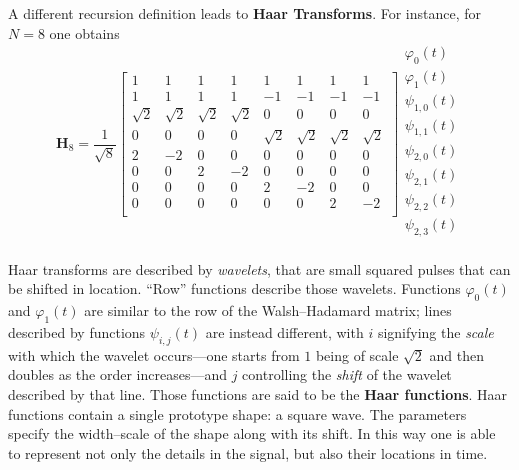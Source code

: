 \documentclass[\documentfontsize, twocolumn]{\classname}
\begin{document}
A different recursion definition leads to \textbf{Haar Transforms}. For instance, for $N=8$ one obtains
\begin{equation}\label{eqn:haarTransformExample}
    \bm H_8 = \frac {1}{\sqrt 8}
    \begin{bmatrix}
        1 & 1 & 1 & 1 & 1 & 1 & 1 & 1\\
        1 & 1 & 1 & 1 & -1 & -1 & -1 & -1\\
        \sqrt 2 & \sqrt 2 & \sqrt 2 & \sqrt 2 & 0 & 0 & 0 & 0\\
        0 & 0 & 0 & 0 & \sqrt 2 & \sqrt 2 & \sqrt 2 & \sqrt 2\\
        2 & -2 & 0 & 0 & 0 & 0 & 0 & 0\\
        0 & 0 & 2 & -2 & 0 & 0 & 0 & 0\\
        0 & 0 & 0 & 0 & 2 & -2 & 0 & 0\\
        0 & 0 & 0 & 0 & 0 & 0 & 2 & -2\\
    \end{bmatrix}
    \begin{matrix}
        \varphi_0(t)\\
        \varphi_1(t)\\
        \psi_{1,0}(t)\\
        \psi_{1,1}(t)\\
        \psi_{2,0}(t)\\
        \psi_{2,1}(t)\\
        \psi_{2,2}(t)\\
        \psi_{2,3}(t)\\
    \end{matrix}
\end{equation}


Haar transforms are described by \emph{wavelets}, that are small squared pulses that can be shifted in location. ``Row'' functions describe those wavelets. Functions $\varphi_0(t)$ and $\varphi_1(t)$ are similar to the row of the Walsh--Hadamard matrix; lines described by functions $\psi_{i,j}(t)$ are instead different, with $i$ signifying the \emph{scale} with which the wavelet occurs---one starts from $1$ being of scale $\sqrt 2$ and then doubles as the order increases---and $j$ controlling the \emph{shift} of the wavelet described by that line. Those functions are said to be the \textbf{Haar functions}. Haar functions contain a single prototype shape: a square wave. The parameters specify the width--scale of the shape along with its shift. In this way one is able to represent not only the details in the signal, but also their locations in time.
\end{document}
